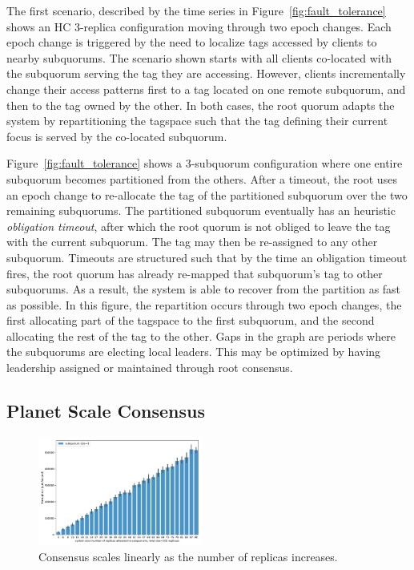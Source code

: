 \documentclass[10pt,conference]{IEEEtran}
\begin{document}
The first scenario, described by the time series in Figure~\ref{fig:fault_tolerance}
shows an HC 3-replica configuration moving through two epoch changes.
Each epoch change is triggered by the need to localize tags accessed by
clients to nearby subquorums.
The scenario shown starts with all clients co-located with the subquorum serving the tag
they are accessing.
However, clients incrementally change their access patterns first to a tag located on
one remote subquorum, and then to the tag owned by the other.
In both cases, the root quorum adapts the system by repartitioning the tagspace such
that the tag defining their current focus is served by the co-located subquorum.

Figure~\ref{fig:fault_tolerance} shows a 3-subquorum configuration where one
entire subquorum becomes partitioned from the others.
After a timeout, the root uses an epoch change to re-allocate the tag of the partitioned
subquorum over the two remaining subquorums.
The partitioned subquorum eventually has an heuristic \emph{obligation timeout}, after
which the  root quorum is not obliged to leave the tag with the current subquorum.
The tag may then be re-assigned to any other subquorum.
Timeouts are structured such that by the time an obligation timeout fires, the root
quorum has already re-mapped that subquorum's tag to other subquorums.
As a result, the system is able to recover from the partition as fast as possible.
In this figure, the repartition occurs through two epoch changes, the first allocating
part of the tagspace to the first subquorum, and the second allocating the rest of the
tag to the other.
Gaps in the graph are periods where the subquorums are electing local leaders.
This may be optimized by having leadership assigned or maintained through root consensus.

\subsection{Planet Scale Consensus}
\label{section:scaling}

\begin{figure}
    \centering
    \includegraphics[width=0.48\textwidth]{figures/geoconsensus_throughput}
    \caption{Consensus scales linearly as the number of replicas increases.}
    \label{fig:geoconsensus_throughput}
\end{figure}
\end{document}
